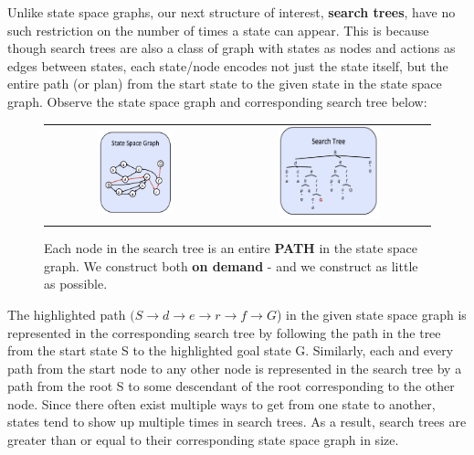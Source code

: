 \documentclass{article}[letterpaper]
\begin{document}
Unlike state space graphs, our next structure of interest, \textbf{search trees}, have no such restriction on the number of times a state can appear. This is because though search trees are also a class of graph with states as nodes and actions as edges between states, each state/node encodes not just the state itself, but the entire path (or plan) from the start state to the given state in the state space graph. Observe the state space graph and corresponding search tree below:

\begin{figure}
\begin{tabular}{c c}
\includegraphics[width=0.44\textwidth]{figs/StateSpaceGraph} & \includegraphics[width=0.52\textwidth]{figs/SearchTree}  \\
\end{tabular}
\caption{Each node in the search tree is an entire \textbf{PATH} in the state space graph.  We construct both \textbf{on demand} - and 
we construct as little as possible.  }
\end{figure}


The highlighted path $(S \rightarrow d \rightarrow e \rightarrow r \rightarrow f \rightarrow G$) in the given state space graph is represented in the corresponding search tree by following the path in the tree from the start state S to the highlighted goal state G. Similarly, each and every path from the start node to any other node is represented in the search tree by a path from the root S to some descendant of the root corresponding to the other node. Since there often exist multiple ways to get from one state to another, states tend to show up multiple times in search trees. As a result, search trees are greater than or equal to their corresponding state space graph in size.
\end{document}
